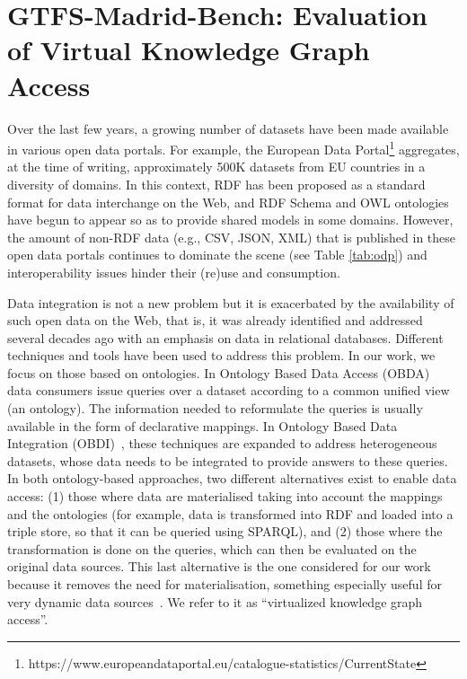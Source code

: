 
\section{GTFS-Madrid-Bench: Evaluation of Virtual Knowledge Graph Access}

Over the last few years, a growing number of datasets have been made available in various open data portals. For example, the European Data Portal\footnote{https://www.europeandataportal.eu/catalogue-statistics/CurrentState} aggregates, at the time of writing, approximately 500K datasets from EU countries in a diversity of domains. In this context, RDF has been proposed as a standard format for data interchange on the Web, and RDF Schema and OWL ontologies have begun to appear so as to provide shared models in some domains. However, the amount of non-RDF data (e.g., CSV, JSON, XML) that is published in these open data portals continues to dominate the scene (see Table \ref{tab:odp}) and interoperability issues hinder their (re)use and consumption. 

Data integration is not a new problem but it is exacerbated by the availability of such open data on the Web, that is, it was already identified and addressed several decades ago with an emphasis on data in relational databases. Different techniques and tools have been used to address this problem. In our work, we focus on those based on ontologies. In Ontology Based Data Access (OBDA)~\citep{poggi2008linking} data consumers issue queries over a dataset according to a common unified view (an ontology). The information needed to reformulate the queries is usually available in the form of declarative mappings. In Ontology Based Data Integration (OBDI)~\citep{poggi2008linking}, these techniques are expanded to address heterogeneous datasets, whose data needs to be integrated to provide answers to these queries. In both ontology-based approaches, two different alternatives exist to enable data access: (1) those where data are materialised taking into account the mappings and the ontologies (for example, data is transformed into RDF and loaded into a triple store, so that it can be queried using SPARQL), and (2) those where the transformation is done on the queries, which can then be evaluated on the original data sources. This last alternative is the one considered for our work because it removes the need for materialisation, something especially useful for very dynamic data sources~\citep{corcho2019towards}. We refer to it as ``virtualized knowledge graph access''.

